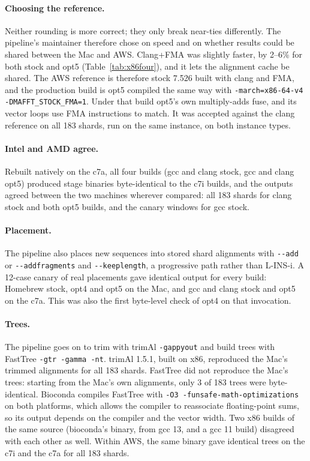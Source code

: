 \documentclass[11pt]{article}
\newcommand{\code}[1]{\texttt{#1}}
\begin{document}
\paragraph{Choosing the reference.} Neither rounding is more correct; they only break
near-ties differently. The pipeline's maintainer therefore chose on speed and on whether
results could be shared between the Mac and AWS. Clang+FMA was slightly faster, by 2--6\%
for both stock and opt5 (Table~\ref{tab:x86four}), and it lets the alignment cache be shared.
The AWS reference is therefore stock 7.526 built with clang and FMA, and the production build is
opt5 compiled the same way with \code{-march=x86-64-v4 -DMAFFT\_STOCK\_FMA=1}. Under that
build opt5's own multiply-adds fuse, and its vector loops use FMA instructions to match. It
was accepted against the clang reference on all 183 shards, run on the same instance, on
both instance types.

\paragraph{Intel and AMD agree.} Rebuilt natively on the c7a, all four builds (gcc and clang
stock, gcc and clang opt5) produced stage binaries byte-identical to the c7i builds, and the
outputs agreed between the two machines wherever compared: all 183 shards for clang stock and
both opt5 builds, and the canary windows for gcc stock.

\paragraph{Placement.} The pipeline also places new sequences into stored shard
alignments with \code{-{}-add} or \code{-{}-addfragments} and \code{-{}-keeplength}, a
progressive path rather than L-INS-i. A 12-case canary of real placements gave identical
output for every build: Homebrew stock, opt4 and opt5 on the Mac, and gcc and clang stock and
opt5 on the c7a. This was also the first byte-level check of opt4 on that invocation.

\paragraph{Trees.} The pipeline goes on to trim with trimAl \code{-gappyout} and build trees
with FastTree \code{-gtr -gamma -nt}. trimAl 1.5.1, built on x86, reproduced the Mac's
trimmed alignments for all 183 shards. FastTree did not reproduce the Mac's trees: starting
from the Mac's own alignments, only 3 of 183 trees were byte-identical. Bioconda compiles
FastTree with \code{-O3 -funsafe-math-optimizations} on both platforms, which allows the
compiler to reassociate floating-point sums, so its output depends on the compiler and the
vector width. Two x86 builds of the same source (bioconda's binary, from gcc 13, and a
gcc 11 build) disagreed with each other as well. Within AWS, the same binary gave
identical trees on the c7i and the c7a for all 183 shards.
\end{document}
